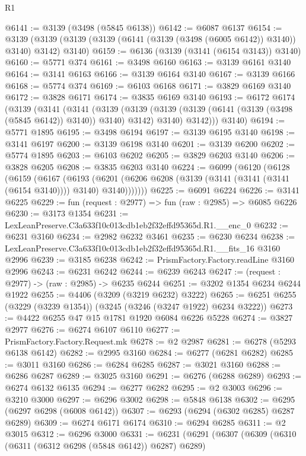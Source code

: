 \begin{lexlean}{R1}
\begin{coremodule}
@6141 := @3139 (@3498 (@5845 @6138))
@6142 := @6087 @6137
@6154 := @3139 (@3139 (@3139 (@3139 (@6141 (@3139 (@3498 (@6005 @6142)) @3140)) @3140) @3142) @3140)
@6159 := @6136 (@3139 (@3141 (@6154 @3143)) @3140)
@6160 := @5771 @374
@6161 := @3498 @6160
@6163 := @3139 @6161 @3140
@6164 := @3141 @6163
@6166 := @3139 @6164 @3140
@6167 := @3139 @6166
@6168 := @5774 @374
@6169 := @6103 @6168
@6171 := @3829 @6169 @3140
@6172 := @3828 @6171
@6174 := @3835 @6169 @3140
@6193 := @6172
    @6174
    (@3139
      (@3141
        (@3141
          (@3139
            (@3139 (@3139 (@3139 (@6141 (@3139 (@3498 (@5845 @6142)) @3140)) @3140) @3142) @3140)
            @3142)))
      @3140)
@6194 := @5771 @1895
@6195 := @3498 @6194
@6197 := @3139 @6195 @3140
@6198 := @3141 @6197
@6200 := @3139 @6198 @3140
@6201 := @3139 @6200
@6202 := @5774 @1895
@6203 := @6103 @6202
@6205 := @3829 @6203 @3140
@6206 := @3828 @6205
@6208 := @3835 @6203 @3140
@6224 := @6099
    (@6120
      (@6128
        (@6159
          (@6167
            (@6193
              (@6201 (@6206 @6208 (@3139 (@3141 (@3141 (@3141 (@6154 @3140)))) @3140) @3140)))))))
@6225 := @6091 @6224
@6226 := @3141 @6225
@6229 := fun (request : @2977) => fun (raw : @2985) => @6085 @6226
@6230 := @3173 @1354
@6231 := LexLeanPreserve.C3a633f10c013cdb1eb2f32effd95365d.R1.__enc_0
@6232 := @6231 @3160
@6234 := @2982 @6232 @3461
@6235 := @6230 @6234
@6238 := LexLeanPreserve.C3a633f10c013cdb1eb2f32effd95365d.R1.__fits_16 @3160 @2996
@6239 := @3185 @6238
@6242 := PrismFactory.Factory.readLine @3160 @2996
@6243 := @6231 @6242
@6244 := @6239 @6243
@6247 := (request : @2977) -> (raw : @2985) -> @6235 @6244
@6251 := @3202 @1354 @6234 @6244 @1922
@6255 := @4406 (@3209 (@3219 @6232) @3222)
@6265 := @6251 @6255 (@3229 (@3239 @1354)) (@3245 (@3246 (@3247 @1922) @6234 @3222))
@6273 := @4422 @6255 @47 @15 @1781 @1920 @6084 @6226 @5228
@6274 := @3827 @2977
@6276 := @6274 @6107 @6110
@6277 := PrismFactory.Factory.Request.mk
@6278 := @2 @2987
@6281 := @6278 (@5293 @6138 @6142)
@6282 := @2995 @3160
@6284 := @6277 (@6281 @6282)
@6285 := @3011 @3160
@6286 := @6284 @6285
@6287 := @3021 @3160
@6288 := @6286 @6287
@6289 := @3025 @3160
@6291 := @6276 (@6288 @6289)
@6293 := @6274 @6132 @6135
@6294 := @6277 @6282
@6295 := @2 @3003
@6296 := @3210 @3000
@6297 := @6296 @3002
@6298 := @5848 @6138
@6302 := @6295 (@6297 @6298 (@6008 @6142))
@6307 := @6293 (@6294 (@6302 @6285) @6287 @6289)
@6309 := @6274 @6171 @6174
@6310 := @6294 @6285
@6311 := @2 @3015
@6312 := @6296 @3000
@6331 := @6231
    (@6291
      (@6307
        (@6309
          (@6310 (@6311 (@6312 @6298 (@5848 @6142)) @6287) @6289)

\end{coremodule}
\end{lexlean}
